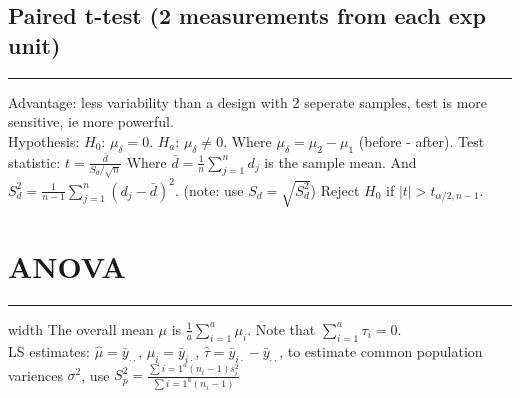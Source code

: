 \documentclass[10pt]{article}
\begin{document}
\subsection*{Paired t-test (2 measurements from each exp unit)}
\hrule width 11cm
\vspace{6pt}
Advantage: less variability than a design with 2 seperate samples, test is more sensitive, ie more powerful. \\
Hypothesis: $H_0$: $\mu_{\delta} = 0$. $H_a$: $\mu_{\delta} \neq 0$. Where $\mu_{\delta} = \mu_2 - \mu_1$ (before - after).
Test statistic: $t = \frac{\bar{d}}{S_d / \sqrt{n}}$ Where $\bar{d} = \frac{1}{n}\sum_{j=1}^{n}d_j$ is the sample mean.
And $S_d^2 = \frac{1}{n-1} \sum_{j=1}^{n}(d_j - \bar{d})^2$. (note: use $S_d = \sqrt{S_d^2}$) Reject $H_0$ if $\left| t \right| > t_{\alpha/2, n-1}$.

\section*{ANOVA}
\hrule width \textwidth
\vspace{6pt}
The overall mean $\mu$ is $\frac{1}{a} \sum_{i=1}^{a} \mu_i$. Note that $\sum_{i=1}^{a}\tau_i = 0$. \\
LS estimates: $\hat{\mu} = \bar{y}_{\cdot \cdot}$, $\hat{\mu}_i = \bar{y}_{i \cdot}$, $\hat{\tau} = \bar{y}_{i \cdot} - \bar{y}_{\cdot \cdot}$, to estimate common population variences $\sigma^2$, use $S_p^2 = \frac{\sum{i=1}^{a}(n_i - 1)s_i^2}{\sum{i=1}^{a}(n_i -1)}$
\end{document}
